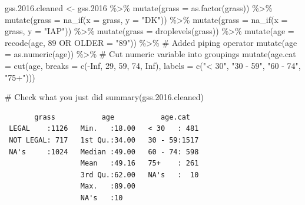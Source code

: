 \documentclass[
  letterpaper,
  DIV=11,
  numbers=noendperiod]{scrreprt}
\newenvironment{Shaded}{\begin{snugshade}}{\end{snugshade}}
\newcommand{\AttributeTok}[1]{\textcolor[rgb]{0.40,0.45,0.13}{#1}}
\newcommand{\CommentTok}[1]{\textcolor[rgb]{0.37,0.37,0.37}{#1}}
\newcommand{\ConstantTok}[1]{\textcolor[rgb]{0.56,0.35,0.01}{#1}}
\newcommand{\DecValTok}[1]{\textcolor[rgb]{0.68,0.00,0.00}{#1}}
\newcommand{\FloatTok}[1]{\textcolor[rgb]{0.68,0.00,0.00}{#1}}
\newcommand{\FunctionTok}[1]{\textcolor[rgb]{0.28,0.35,0.67}{#1}}
\newcommand{\NormalTok}[1]{\textcolor[rgb]{0.00,0.23,0.31}{#1}}
\newcommand{\OtherTok}[1]{\textcolor[rgb]{0.00,0.23,0.31}{#1}}
\newcommand{\SpecialCharTok}[1]{\textcolor[rgb]{0.37,0.37,0.37}{#1}}
\newcommand{\StringTok}[1]{\textcolor[rgb]{0.13,0.47,0.30}{#1}}
\begin{document}
\begin{itemize}
\begin{Shaded}
\begin{Highlighting}[]
\NormalTok{gss.}\FloatTok{2016.}\NormalTok{cleaned }\OtherTok{\textless{}{-}}\NormalTok{ gss}\FloatTok{.2016} \SpecialCharTok{\%\textgreater{}\%}
    \FunctionTok{mutate}\NormalTok{(}\AttributeTok{grass =} \FunctionTok{as.factor}\NormalTok{(grass)) }\SpecialCharTok{\%\textgreater{}\%}
    \FunctionTok{mutate}\NormalTok{(}\AttributeTok{grass =} \FunctionTok{na\_if}\NormalTok{(}\AttributeTok{x =}\NormalTok{ grass, }\AttributeTok{y =} \StringTok{"DK"}\NormalTok{)) }\SpecialCharTok{\%\textgreater{}\%}
    \FunctionTok{mutate}\NormalTok{(}\AttributeTok{grass =} \FunctionTok{na\_if}\NormalTok{(}\AttributeTok{x =}\NormalTok{ grass, }\AttributeTok{y =} \StringTok{"IAP"}\NormalTok{)) }\SpecialCharTok{\%\textgreater{}\%}
    \FunctionTok{mutate}\NormalTok{(}\AttributeTok{grass =} \FunctionTok{droplevels}\NormalTok{(grass)) }\SpecialCharTok{\%\textgreater{}\%}
    \FunctionTok{mutate}\NormalTok{(}\AttributeTok{age =} \FunctionTok{recode}\NormalTok{(age, }\StringTok{\textasciigrave{}}\AttributeTok{89 OR OLDER}\StringTok{\textasciigrave{}} \OtherTok{=} \StringTok{"89"}\NormalTok{)) }\SpecialCharTok{\%\textgreater{}\%}
    \CommentTok{\# Added piping operator}
\FunctionTok{mutate}\NormalTok{(}\AttributeTok{age =} \FunctionTok{as.numeric}\NormalTok{(age)) }\SpecialCharTok{\%\textgreater{}\%}
    \CommentTok{\# Cut numeric variable into groupings}
\FunctionTok{mutate}\NormalTok{(}\AttributeTok{age.cat =} \FunctionTok{cut}\NormalTok{(age, }\AttributeTok{breaks =} \FunctionTok{c}\NormalTok{(}\SpecialCharTok{{-}}\ConstantTok{Inf}\NormalTok{, }\DecValTok{29}\NormalTok{, }\DecValTok{59}\NormalTok{, }\DecValTok{74}\NormalTok{, }\ConstantTok{Inf}\NormalTok{), }\AttributeTok{labels =} \FunctionTok{c}\NormalTok{(}\StringTok{"\textless{} 30"}\NormalTok{,}
    \StringTok{"30 {-} 59"}\NormalTok{, }\StringTok{"60 {-} 74"}\NormalTok{, }\StringTok{"75+"}\NormalTok{)))}

\CommentTok{\# Check what you just did}
\FunctionTok{summary}\NormalTok{(gss.}\FloatTok{2016.}\NormalTok{cleaned)}
\end{Highlighting}
\end{Shaded}

\begin{verbatim}
       grass           age           age.cat    
 LEGAL    :1126   Min.   :18.00   < 30   : 481  
 NOT LEGAL: 717   1st Qu.:34.00   30 - 59:1517  
 NA's     :1024   Median :49.00   60 - 74: 598  
                  Mean   :49.16   75+    : 261  
                  3rd Qu.:62.00   NA's   :  10  
                  Max.   :89.00                 
                  NA's   :10                    
\end{verbatim}
\end{itemize}
\end{document}
